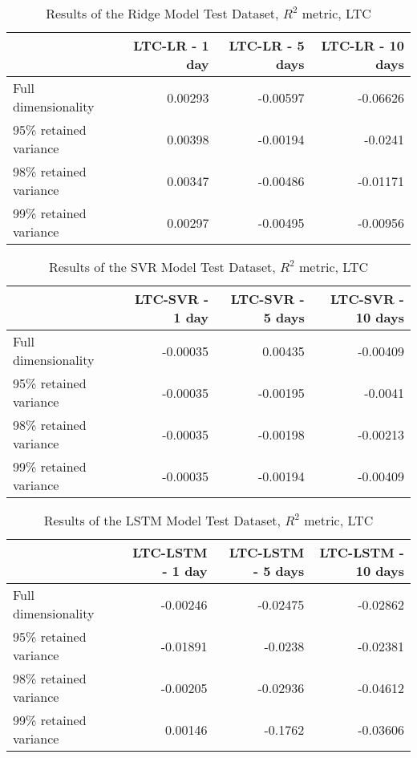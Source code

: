     \begin{table}[htbp]
        \centering
        \caption{Results of the Ridge Model Test Dataset, $R^2$ metric, LTC}
    \begin{tabular}{lrrr}
        \toprule
        {} &  LTC-LR - 1 day &  LTC-LR - 5 days &  LTC-LR - 10 days\\
        \midrule
        Full dimensionality   &    0.00293  &   -0.00597    &     -0.06626    \\
        95\% retained variance &   0.00398  &   -0.00194     &      -0.0241  \\
        98\% retained variance &    0.00347    &   -0.00486      &  -0.01171    \\
        99\% retained variance &   0.00297    &    -0.00495   &    -0.00956   \\
        \bottomrule
        \end{tabular}
    \end{table}
    
    \begin{table}[htbp]
        \centering
        \caption{Results of the SVR Model Test Dataset, $R^2$ metric, LTC}
    \begin{tabular}{lrrr}
        \toprule
        {} &  LTC-SVR - 1 day &  LTC-SVR - 5 days &  LTC-SVR - 10 days\\
        \midrule
        Full dimensionality     & -0.00035 &    0.00435    &    -0.00409     \\
        95\% retained variance   & -0.00035 &   -0.00195    &      -0.0041  \\
        98\% retained variance   & -0.00035  &      -0.00198   &    -0.00213      \\
        99\% retained variance   &  -0.00035 &    -0.00194     &    -0.00409    \\
        \bottomrule
    \end{tabular}
    \end{table}
    
    \begin{table}[htbp]
        \centering
        \caption{Results of the LSTM Model Test Dataset, $R^2$ metric, LTC}
    \begin{tabular}{lrrr}
        \toprule
        {} &  LTC-LSTM - 1 day &  LTC-LSTM - 5 days &  LTC-LSTM - 10 days \\
        \midrule
        Full dimensionality   &    -0.00246   &     -0.02475      &    -0.02862       \\
        95\% retained variance &  -0.01891     &    -0.0238       &    -0.02381        \\
        98\% retained variance &   -0.00205    &    -0.02936     &    -0.04612        \\
        99\% retained variance &   0.00146   &   -0.1762    &    -0.03606       \\
        \bottomrule
    \end{tabular}
    \end{table}
    